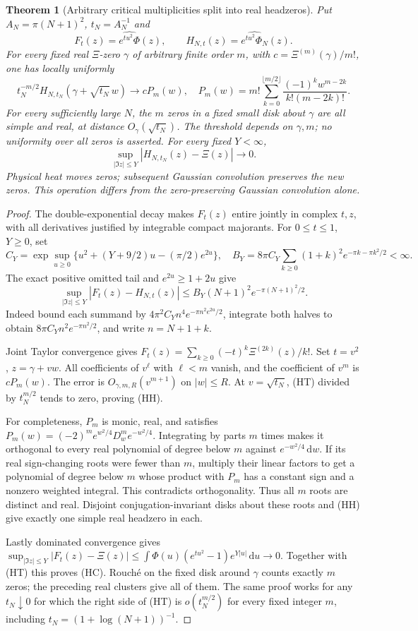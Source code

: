 \documentclass[11pt]{article}
\newtheorem{theorem}{Theorem}
\theoremstyle{remark}\newtheorem{remark}[theorem]{Remark}
\newcommand{\dd}{\,\mathrm d}
\begin{document}
\begin{theorem}[Arbitrary critical multiplicities split into real headzeros]
\label{thm:heated-head-local}
Put $A_N=\pi(N+1)^2$, $t_N=A_N^{-1}$ and
\[
 F_t(z)=\widehat{e^{tu^2}\Phi}(z),\qquad
 H_{N,t}(z)=\widehat{e^{tu^2}\Phi_N}(z).
\]
For every fixed real $\Xi$-zero $\gamma$ of arbitrary finite order $m$,
with $c=\Xi^{(m)}(\gamma)/m!$, one has locally uniformly
\[
 t_N^{-m/2}H_{N,t_N}(\gamma+\sqrt{t_N}\,w)
 \longrightarrow cP_m(w),\quad
 P_m(w)=m!\sum_{k=0}^{\lfloor m/2\rfloor}
              \frac{(-1)^kw^{m-2k}}{k!(m-2k)!}.          \tag{HH}
\]
For every sufficiently large $N$, the $m$ zeros in a fixed small disk
about $\gamma$ are all simple and real, at distance $O_\gamma(\sqrt{t_N})$.
The threshold depends on $\gamma,m$; no uniformity over all zeros is
asserted. For every fixed $Y<\infty$,
\[
 \sup_{|\Im z|\le Y}|H_{N,t_N}(z)-\Xi(z)|\longrightarrow0. \tag{HC}
\]
Physical heat moves zeros; subsequent Gaussian convolution preserves
the new zeros. This operation differs from the zero-preserving
Gaussian convolution alone.
\end{theorem}
\begin{proof}
The double-exponential decay makes $F_t(z)$ entire jointly in complex
$t,z$, with all derivatives justified by integrable compact majorants.
For $0\le t\le1$, $Y\ge0$, set
\[
 C_Y=\exp\sup_{u\ge0}\{u^2+(Y+9/2)u-(\pi/2)e^{2u}\},
 \quad
 B_Y=8\pi C_Y\sum_{k\ge0}(1+k)^2e^{-\pi k-\pi k^2/2}<\infty .
\]
The exact positive omitted tail and $e^{2u}\ge1+2u$ give
\[
 \sup_{|\Im z|\le Y}|F_t(z)-H_{N,t}(z)|
       \le B_Y(N+1)^2e^{-\pi(N+1)^2/2}.                 \tag{HT}
\]
Indeed bound each summand by
$4\pi^2 C_Yn^4e^{-\pi n^2e^{2u}/2}$, integrate both halves to obtain
$8\pi C_Yn^2e^{-\pi n^2/2}$, and write $n=N+1+k$.

Joint Taylor convergence gives
$F_t(z)=\sum_{k\ge0}(-t)^k\Xi^{(2k)}(z)/k!$.
Set $t=v^2$, $z=\gamma+vw$.
All coefficients of $v^\ell$ with $\ell<m$ vanish, and the coefficient
of $v^m$ is $cP_m(w)$.
The error is $O_{\gamma,m,R}(v^{m+1})$ on $|w|\le R$.
At $v=\sqrt{t_N}$, (HT) divided by $t_N^{m/2}$ tends to zero,
proving (HH).

For completeness, $P_m$ is monic, real, and satisfies
$P_m(w)=(-2)^me^{w^2/4}D_w^me^{-w^2/4}$.
Integrating by parts $m$ times makes it orthogonal to every real
polynomial of degree below $m$ against $e^{-w^2/4}\dd w$.
If its real sign-changing roots were fewer than $m$, multiply their
linear factors to get a polynomial of degree below $m$ whose product
with $P_m$ has a constant sign and a nonzero weighted integral.
This contradicts orthogonality. Thus all $m$ roots are distinct and real.
Disjoint conjugation-invariant disks about these roots and (HH)
give exactly one simple real headzero in each.

Lastly dominated convergence gives
$\sup_{|\Im z|\le Y}|F_t(z)-\Xi(z)|
\le\int\Phi(u)(e^{tu^2}-1)e^{Y|u|}\dd u\to0$.
Together with (HT) this proves (HC).
Rouch\'e on the fixed disk around $\gamma$ counts exactly $m$ zeros;
the preceding real clusters give all of them.
The same proof works for any $t_N\downarrow0$ for which the right side
of (HT) is $o(t_N^{m/2})$ for every fixed integer $m$,
including $t_N=(1+\log(N+1))^{-1}$.
\end{proof}
\end{document}

